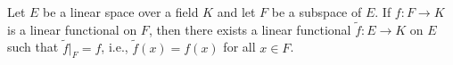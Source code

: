 Let $E$ be a linear space over a field $K$ and let $F$ be a subspace of $E$. If $f : F \to K$ is a linear functional on $F$, then there exists a linear functional $\tilde{f} : E \to K$ on $E$ such that $\tilde{f}|_F = f$, i.e., $\tilde{f}(x) = f(x)$ for all $x \in F$.

